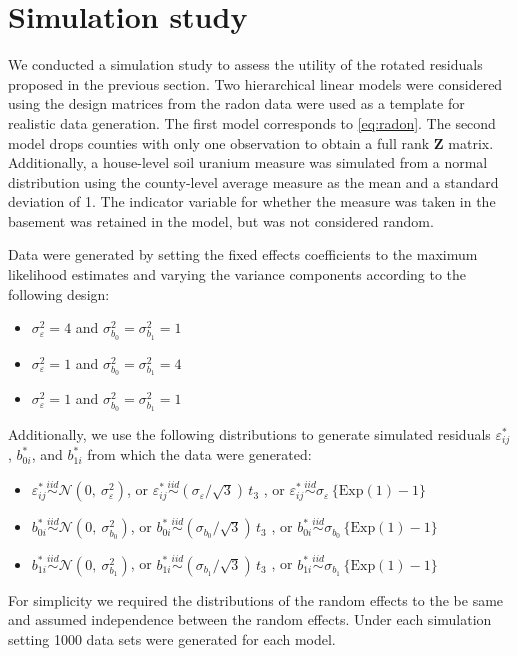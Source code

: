\documentclass{article} %
\newcommand{\al}[1]{{\color{red} #1}}
\begin{document}
\section{Simulation study}\label{sec:simulation}
\al{
We conducted a simulation study to assess the utility of the rotated residuals proposed in the previous section. Two hierarchical linear models were considered using the design matrices from the radon data were used as a template for realistic data generation. The first model corresponds to \eqref{eq:radon}. The second model drops counties with only one observation to obtain a full rank $\bm{Z}$ matrix. Additionally, a house-level soil uranium measure was simulated from a normal distribution using the county-level average measure as the mean and a standard deviation of 1. The indicator variable for whether the measure was taken in the basement was retained in the model, but was not considered random.

Data were generated by setting the fixed effects coefficients to the maximum likelihood estimates and varying the variance components according to the following design:
%
\begin{itemize}
\item $\sigma^2_\varepsilon = 4$ and  $\sigma^2_{b_0} = \sigma^2_{b_1} = 1$
\item $\sigma^2_\varepsilon = 1$ and  $\sigma^2_{b_0} = \sigma^2_{b_1} = 4$
\item $\sigma^2_\varepsilon = 1$ and  $\sigma^2_{b_0} = \sigma^2_{b_1} = 1$
\end{itemize}
%
Additionally, we use the following distributions to generate simulated residuals $\varepsilon_{ij}^*$, $b_{0i}^*$, and $b_{1i}^*$ from which the data were generated:
%
\begin{itemize}
\item $\varepsilon_{ij}^* \overset{iid}{\sim} \mathcal{N}(0, \ \sigma^2_{\varepsilon})$, or $\varepsilon_{ij}^* \overset{iid}{\sim} (\sigma_{\varepsilon} / \sqrt{3})\, t_3$ , or $\varepsilon_{ij}^* \overset{iid}{\sim} \sigma_{\varepsilon} \, \{ \text{Exp}(1) - 1 \}$

\item $b_{0i}^* \overset{iid}{\sim} \mathcal{N}(0, \ \sigma^2_{b_{0}})$, or $b_{0i}^* \overset{iid}{\sim} (\sigma_{b_{0}} / \sqrt{3})\, t_3$ , or $b_{0i}^* \overset{iid}{\sim} \sigma_{b_{0}} \, \{ \text{Exp}(1) - 1 \}$

\item $b_{1i}^* \overset{iid}{\sim} \mathcal{N}(0, \ \sigma^2_{b_{1}})$, or $b_{1i}^* \overset{iid}{\sim} (\sigma_{b_{1}} / \sqrt{3})\, t_3$ , or $b_{1i}^* \overset{iid}{\sim} \sigma_{b_{1}} \, \{ \text{Exp}(1) - 1 \}$
\end{itemize}
%
For simplicity we required the distributions of the random effects to the be same and assumed independence between the random effects. Under each simulation setting 1000 data sets were generated for each model.

}
\end{document}
